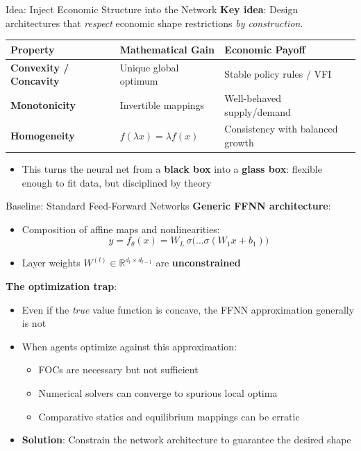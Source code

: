 \documentclass[10pt,english,aspectratio=169]{beamer}
\begin{document}
\begin{frame}{Idea: Inject Economic Structure into the Network}
\textbf{Key idea}: Design architectures that \emph{respect} economic shape restrictions \emph{by construction}.

\vspace{0.3cm}
\centering
\begin{table}[]
\renewcommand{\arraystretch}{1.4}
\begin{tabular}{l | l | l}
\textbf{Property} & \textbf{Mathematical Gain} & \textbf{Economic Payoff} \\
\hline
\textbf{Convexity / Concavity} & Unique global optimum & Stable policy rules / VFI \\
\hline
\textbf{Monotonicity} & Invertible mappings & Well-behaved supply/demand \\
\hline
\textbf{Homogeneity} & $f(\lambda x) = \lambda f(x)$ & Consistency with balanced growth \\
\end{tabular}
\end{table}

\vspace{0.3cm}
\begin{itemize}
  \item This turns the neural net from a \textbf{black box} into a \textbf{glass box}: flexible enough to fit data, but disciplined by theory
\end{itemize}
\end{frame}

\begin{frame}{Baseline: Standard Feed-Forward Networks}
\textbf{Generic FFNN architecture}:
\begin{itemize}
  \item Composition of affine maps and nonlinearities:
    \[
      y = f_\theta(x) = W_L\, \sigma\bigl(\ldots \sigma(W_1 x + b_1)\bigr)
    \]
  \item Layer weights $W^{(l)} \in \mathbb{R}^{d_l \times d_{l-1}}$ are \textbf{unconstrained}
\end{itemize}

\vspace{0.2cm}
\textbf{The optimization trap}:
\begin{itemize}
  \item Even if the \emph{true} value function is concave, the FFNN approximation generally is not
  \item When agents optimize against this approximation:
    \begin{itemize}
      \item FOCs are necessary but not sufficient
      \item Numerical solvers can converge to spurious local optima
      \item Comparative statics and equilibrium mappings can be erratic
    \end{itemize}
  \medskip
  \item \textbf{Solution}: Constrain the network architecture to guarantee the desired shape
\end{itemize}
\end{frame}
\end{document}
